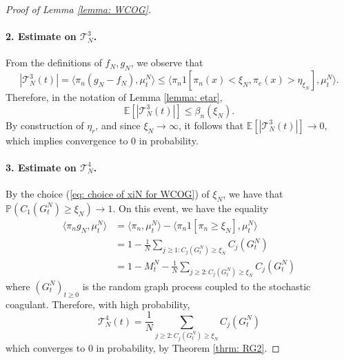 \begin{proof}[Proof of Lemma \ref{lemma: WCOG}]
   \paragraph{2. Estimate on $\mathcal{T}^3_N$.} From the definitions of $f_N, g_N$, we observe that \begin{equation}
       |\mathcal{T}^3_N(t)|=\langle \pi_n(g_N-f_N), \mu^N_t\rangle \le  \langle \pi_n 1[\pi_n(x)<\xi_N, \pi_e(x)>\eta_{\xi_N}], \mu^N_t\rangle.
   \end{equation} Therefore, in the notation of Lemma \ref{lemma: etar}, \begin{equation}
       \mathbb{E}\left[|\mathcal{T}^3_N(t)|\right] \leq \beta_n(\xi_N).
   \end{equation} By construction of $\eta_r$, and since $\xi_N \rightarrow \infty$, it follows that $\mathbb{E}[ |\mathcal{T}^3_N(t)|] \rightarrow 0,$ which implies convergence to $0$ in probability.
       \paragraph{3. Estimate on $\mathcal{T}^4_N$.} By the choice (\ref{eq: choice of xiN for WCOG}) of $\xi_N$, we have that $\mathbb{P}( C_1(G^N_t)\geq \xi_N)\rightarrow 1.$ On this event, we have the equality \begin{equation}
           \begin{split}
               \langle \pi_n g_N, \mu^N_t\rangle &=\langle \pi_n, \mu^N_t\rangle - \langle \pi_n 1[\pi_n\geq \xi_N], \mu^N_t\rangle \\[2ex] & = 1-\frac{1}{N}\sum_{j\geq 1: C_j(G^N_t)\ge \xi_N} C_j(G^N_t) \\[2ex] & = 1-M^N_t-\frac{1}{N}\sum_{j\ge 2:C_j(G^N_t)\ge \xi_N} C_j(G^N_t) 
           \end{split} 
       \end{equation} where $(G^N_t)_{t\geq 0}$ is the random graph process coupled to the stochastic coagulant. Therefore, with high probability, \begin{equation} \mathcal{T}^4_N(t) = \frac{1}{N} \sum_{j\ge 2:C_j(G^N_t)\ge \xi_N} C_j(G^N_t) \end{equation} which converges to $0$ in probability, by Theorem \ref{thrm: RG2}.

\end{proof}
